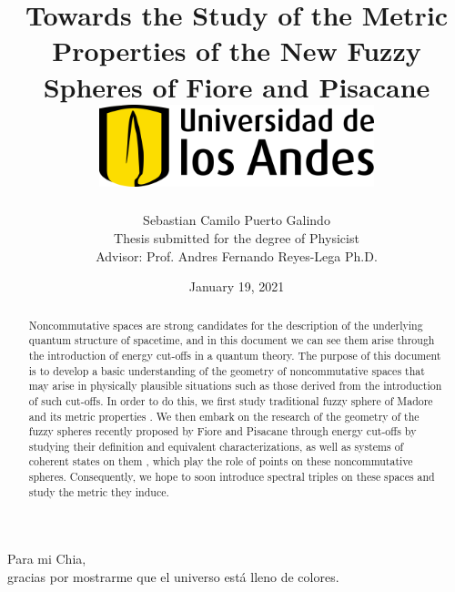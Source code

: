 \documentclass[12pt]{report}
\title 
{
	{Towards the Study of the Metric Properties of the New Fuzzy Spheres of Fiore and Pisacane}\\
	\vspace{1.5cm}
	{\includegraphics[width = 0.6\textwidth]{logo.png}}	
}
\author{Sebastian Camilo Puerto Galindo\\[1cm]{\small Thesis submitted for the degree of Physicist}\\ {\small  Advisor: Prof. Andres Fernando Reyes-Lega Ph.D.}}
\date{January 19, 2021}
\newenvironment{dedication}
  {\clearpage           %
   \thispagestyle{empty}%
   \vspace*{\stretch{1}}%
   \raggedleft          %
  }
  {\par %
   \vspace{\stretch{3}} %
   \clearpage           %
  }
\theoremstyle{definition}
\begin{document}

\maketitle

\begin{dedication}
{\LARGE\calligra Para mi Chia,\\ gracias por mostrarme que el universo está lleno de colores.}
\end{dedication}

\begin{abstract}
Noncommutative spaces are strong candidates for the description of the underlying quantum structure of spacetime, and in this document we can see them arise through the introduction of energy cut-offs in a quantum theory. The purpose of this document is to develop a basic understanding of the geometry of noncommutative spaces that may arise in physically plausible situations such as those derived from the introduction of such cut-offs. In order to do this, we first study traditional fuzzy sphere of Madore \cite{Madore} and its metric properties \cite{DAndrea2013}. We then embark on the research of the geometry of the fuzzy spheres recently proposed by Fiore and Pisacane \cite{Fiore2018} through energy cut-offs by studying their definition and equivalent characterizations, as well as systems of coherent states on them \cite{FioreCoherent2020, FioreXi2020}, which play the role of points on these noncommutative spheres. Consequently, we hope to soon introduce spectral triples on these spaces and study the metric they induce. %
\end{abstract}
\end{document}
